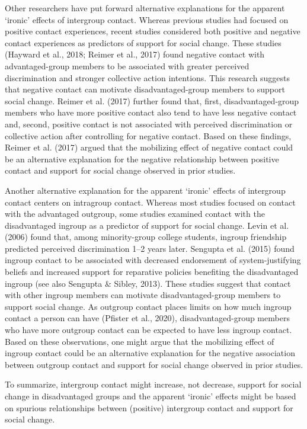 \documentclass[12pt, letterpaper]{article}
\begin{document}
Other researchers have put forward alternative explanations for the
apparent `ironic' effects of intergroup contact. Whereas previous
studies had focused on positive contact experiences, recent studies
considered both positive and negative contact experiences as predictors
of support for social change. These studies (Hayward et al., 2018;
Reimer et al., 2017) found negative contact with advantaged-group
members to be associated with greater perceived discrimination and
stronger collective action intentions. This research suggests that
negative contact can motivate disadvantaged-group members to support
social change. Reimer et al. (2017) further found that, first,
disadvantaged-group members who have more positive contact also tend to
have less negative contact and, second, positive contact is not
associated with perceived discrimination or collective action after
controlling for negative contact. Based on these findings, Reimer et al.
(2017) argued that the mobilizing effect of negative contact could be an
alternative explanation for the negative relationship between positive
contact and support for social change observed in prior studies.

Another alternative explanation for the apparent `ironic' effects of
intergroup contact centers on intragroup contact. Whereas most studies
focused on contact with the advantaged outgroup, some studies examined
contact with the disadvantaged ingroup as a predictor of support for
social change. Levin et al. (2006) found that, among minority-group
college students, ingroup friendship predicted perceived discrimination
1--2 years later. Sengupta et al. (2015) found ingroup contact to be
associated with decreased endorsement of system-justifying beliefs and
increased support for reparative policies benefiting the disadvantaged
ingroup (see also Sengupta \& Sibley, 2013). These studies suggest that
contact with other ingroup members can motivate disadvantaged-group
members to support social change. As outgroup contact places limits on
how much ingroup contact a person can have (Pfister et al., 2020),
disadvantaged-group members who have more outgroup contact can be
expected to have less ingroup contact. Based on these observations, one
might argue that the mobilizing effect of ingroup contact could be an
alternative explanation for the negative association between outgroup
contact and support for social change observed in prior studies.

To summarize, intergroup contact might increase, not decrease, support
for social change in disadvantaged groups and the apparent `ironic'
effects might be based on spurious relationships between (positive)
intergroup contact and support for social change.
\end{document}
